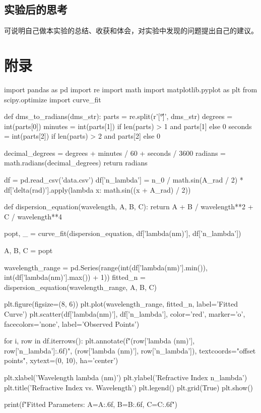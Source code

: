 \documentclass[UTF8]{ctexart}
\begin{document}
\subsection{实验后的思考}
可说明自己做本实验的总结、收获和体会，对实验中发现的问题提出自己的建议。

\newpage
\section{附录}
\begin{python}
    
    import pandas as pd
    import re
    import math
    import matplotlib.pyplot as plt
    from scipy.optimize import curve_fit

    def dms_to_radians(dms_str):
        parts = re.split(r'[°\'\"]', dms_str)
        degrees = int(parts[0])
        minutes = int(parts[1]) if len(parts) > 1 and parts[1] else 0
        seconds = int(parts[2]) if len(parts) > 2 and parts[2] else 0
    
        decimal_degrees = degrees + minutes / 60 + seconds / 3600
        radians = math.radians(decimal_degrees)
        return radians

    df = pd.read_csv('data.csv')
    df['n_lambda'] = n_0 / math.sin(A_rad / 2) * df['delta(rad)'].apply(lambda x: math.sin((x + A_rad) / 2))

    def dispersion_equation(wavelength, A, B, C):
        return A + B / wavelength**2 + C / wavelength**4

    popt, _ = curve_fit(dispersion_equation, df['lambda(nm)'], df['n_lambda'])

    A, B, C = popt

    wavelength_range = pd.Series(range(int(df['lambda(nm)'].min()), int(df['lambda(nm)'].max()) + 1))
    fitted_n = dispersion_equation(wavelength_range, A, B, C)

    plt.figure(figsize=(8, 6))
    plt.plot(wavelength_range, fitted_n, label='Fitted Curve')
    plt.scatter(df['lambda(nm)'], df['n_lambda'], color='red', marker='o', facecolors='none', label='Observed Points')

    for i, row in df.iterrows():
        plt.annotate(f"({row['lambda (nm)']}, {row['n_lambda']:.6f})", (row['lambda (nm)'], row['n_lambda']), textcoords="offset points", xytext=(0, 10), ha='center')

    plt.xlabel('Wavelength lambda (nm)') 
    plt.ylabel('Refractive Index n_lambda')
    plt.title('Refractive Index vs. Wavelength')
    plt.legend()
    plt.grid(True)
    plt.show()

    print(f"Fitted Parameters: A={A:.6f}, B={B:.6f}, C={C:.6f}")
    
\end{python}

\end{document}

